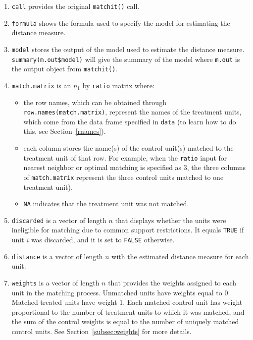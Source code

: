 \documentclass[oneside,letterpaper,titlepage]{article}
\begin{document}
\begin{enumerate}
\item \texttt{call} provides the original {\tt matchit()} call.
  
\item \texttt{formula} shows the formula used to specify the model for
  estimating the distance measure.
  
\item \texttt{model} stores the output of the model used to estimate
  the distance measure.  \texttt{summary(m.out\$model)} will give the
  summary of the model where \texttt{m.out} is the output object from
  \texttt{matchit()}.
  
\item \texttt{match.matrix} is an $n_1$ by \texttt{ratio} matrix
  where:
  \begin{itemize}
  \item the row names, which can be obtained through
    \texttt{row.names(match.matrix)}, represent the names of the
    treatment units, which come from the data frame specified in
    \texttt{data} (to learn how to do this, see Section~\ref{rnames}).
  \item each column stores the name(s) of the control unit(s) matched
    to the treatment unit of that row. For example, when the
    \texttt{ratio} input for nearest neighbor or optimal matching is
    specified as 3, the three columns of \texttt{match.matrix}
    represent the three control units matched to one treatment unit).
  \item \texttt{NA} indicates that the treatment unit was not matched.
  \end{itemize}

\item \texttt{discarded} is a vector of length $n$ that displays
  whether the units were ineligible for matching due to common support
  restrictions.  It equals \texttt{TRUE} if unit $i$ was discarded,
  and it is set to \texttt{FALSE} otherwise.
  
\item \texttt{distance} is a vector of length $n$ with the estimated
  distance measure for each unit.
  
\item \texttt{weights} is a vector of length $n$ that provides the
  weights assigned to each unit in the matching process.  Unmatched
  units have weights equal to $0$. Matched treated units have weight
  $1$.  Each matched control unit has weight proportional to the
  number of treatment units to which it was matched, and the sum of
  the control weights is equal to the number of uniquely matched
  control units. See Section~\ref{subsec:weights} for more details.
  

\end{enumerate}
\end{document}
